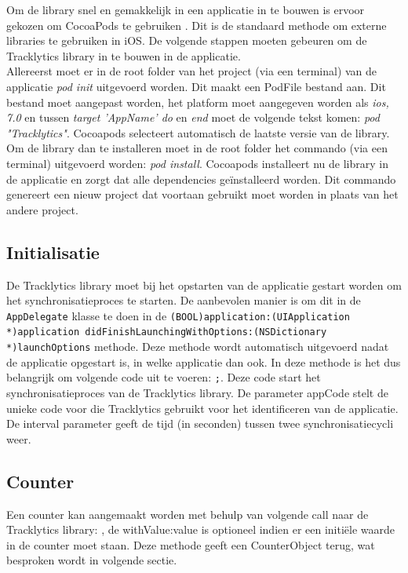Om de library snel en gemakkelijk in een applicatie in te bouwen is ervoor gekozen om CocoaPods te gebruiken \cite{CocoaPods}. Dit is de standaard methode om externe libraries te gebruiken in iOS. De volgende stappen moeten gebeuren om de Tracklytics library in te bouwen in de applicatie. \\

\noindent Allereerst moet er in de root folder van het project (via een terminal) van de applicatie \textit{pod init} uitgevoerd worden. Dit maakt een PodFile bestand aan. Dit bestand moet aangepast worden, het platform moet aangegeven worden als \textit{ios, 7.0} en tussen \textit{target 'AppName' do} en \textit{end} moet de volgende tekst komen: \textit{pod "Tracklytics"}. Cocoapods selecteert automatisch de laatste versie van de library. \\

\noindent Om de library dan te installeren moet in de root folder het commando (via een terminal) uitgevoerd worden: \textit{pod install}. Cocoapods installeert nu de library in de applicatie en zorgt dat alle dependencies geïnstalleerd worden. Dit commando genereert een nieuw project dat voortaan gebruikt moet worden in plaats van het andere project.



\subsection{Initialisatie}
De Tracklytics library moet bij het opstarten van de applicatie gestart worden om het synchronisatieproces te starten. De aanbevolen manier is om dit in de \texttt{\justify AppDelegate} klasse te doen in de \texttt{\justify (BOOL)application:(UIApplication *)application didFinishLaunchingWithOptions:(NSDictionary *)launchOptions} methode. Deze methode wordt automatisch uitgevoerd nadat de applicatie opgestart is, in welke applicatie dan ook. In deze methode is het dus belangrijk om volgende code uit te voeren: \texttt{;}. Deze code start het synchronisatieproces van de Tracklytics library. De parameter appCode stelt de unieke code voor die Tracklytics gebruikt voor het identificeren van de applicatie. De interval parameter geeft de tijd (in seconden) tussen twee synchronisatiecycli weer. 

\subsection{Counter}
Een counter kan aangemaakt worden met behulp van volgende call naar de Tracklytics library: \texttt{}, de withValue:value is optioneel indien er een initi\"ele waarde in de counter moet staan. Deze methode geeft een CounterObject terug, wat besproken wordt in volgende sectie. \\


